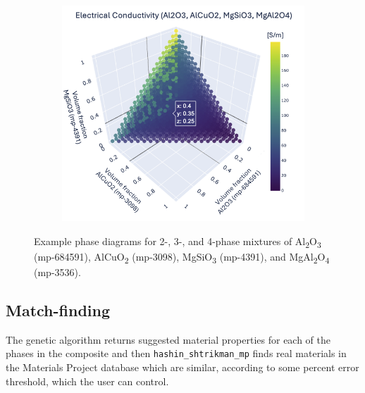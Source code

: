 \documentclass[letterpaper,12pt]{formatfile}
\begin{document}
\begin{figure}[H]
    \begin{subfigure}[t]{0.5\textwidth}
        \centering
        \includegraphics[width=\textwidth]{figures/elec-cond-4phase-clean.png}
        \caption{}
        \label{fig:4phase}
    \end{subfigure}

    \caption{Example phase diagrams for 2-, 3-, and 4-phase mixtures of Al\textsubscript{2}O\textsubscript{3} (mp-684591), AlCuO\textsubscript{2} (mp-3098), MgSiO\textsubscript{3} (mp-4391), and MgAl\textsubscript{2}O\textsubscript{4} (mp-3536).}
    \label{fig:phase-viz}
\end{figure}

\subsection{Match-finding} \label{subsec:match-finding}

The genetic algorithm returns suggested material properties for each of the phases in the composite and then \verb|hashin_shtrikman_mp| finds real materials in the Materials Project database which are similar, according to some percent error threshold, which the user can control.

\end{document}
